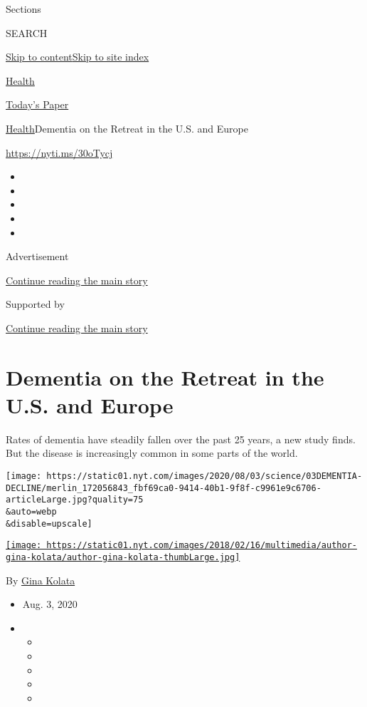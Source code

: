 Sections

SEARCH

\protect\hyperlink{site-content}{Skip to
content}\protect\hyperlink{site-index}{Skip to site index}

\href{https://www.nytimes.com/section/health}{Health}

\href{https://myaccount.nytimes.com/auth/login?response_type=cookie\&client_id=vi}{}

\href{https://www.nytimes.com/section/todayspaper}{Today's Paper}

\href{/section/health}{Health}\textbar{}Dementia on the Retreat in the
U.S. and Europe

\url{https://nyti.ms/30oTycj}

\begin{itemize}
\item
\item
\item
\item
\item
\end{itemize}

Advertisement

\protect\hyperlink{after-top}{Continue reading the main story}

Supported by

\protect\hyperlink{after-sponsor}{Continue reading the main story}

\hypertarget{dementia-on-the-retreat-in-the-us-and-europe}{%
\section{Dementia on the Retreat in the U.S. and
Europe}\label{dementia-on-the-retreat-in-the-us-and-europe}}

Rates of dementia have steadily fallen over the past 25 years, a new
study finds. But the disease is increasingly common in some parts of the
world.

\texttt{[image: https://static01.nyt.com/images/2020/08/03/science/03DEMENTIA-DECLINE/merlin\_172056843\_fbf69ca0-9414-40b1-9f8f-c9961e9c6706-articleLarge.jpg?quality=75\\\&auto=webp\\\&disable=upscale]}

\href{https://www.nytimes.com/by/gina-kolata}{\texttt{[image: https://static01.nyt.com/images/2018/02/16/multimedia/author-gina-kolata/author-gina-kolata-thumbLarge.jpg]}}

By \href{https://www.nytimes.com/by/gina-kolata}{Gina Kolata}

\begin{itemize}
\item
  Aug. 3, 2020
\item
  \begin{itemize}
  \item
  \item
  \item
  \item
  \item
  \end{itemize}
\end{itemize}

